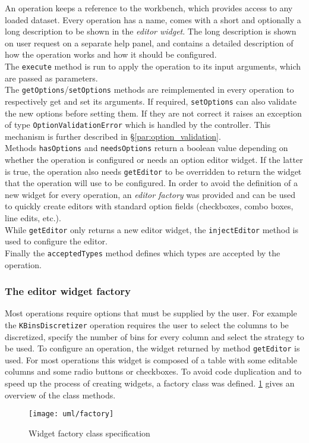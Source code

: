 An operation keeps a reference to the workbench, which provides access to any loaded dataset. Every operation has a name, comes with a short and optionally a long description to be shown in the \textit{editor widget}. The long description is shown on user request on a separate help panel, and contains a detailed description of how the operation works and how it should be configured. \\
The \texttt{execute} method is run to apply the operation to its input arguments, which are passed as parameters.\\
The \texttt{getOptions}/\texttt{setOptions} methods are reimplemented in every operation to respectively get and set its arguments. If required, \texttt{setOptions} can also validate the new options before setting them. If they are not correct it raises an exception of type \texttt{OptionValidationError} which is handled by the controller. This mechanism is further described in §\ref{par:option_validation}.\\
Methods \texttt{hasOptions} and \texttt{needsOptions} return a boolean value depending on whether the operation is configured or needs an option editor widget. If the latter is true, the operation also needs \texttt{getEditor} to be overridden to return the widget that the operation will use to be configured. In order to avoid the definition of a new widget for every operation, an \textit{editor factory} was provided and can be used to quickly create editors with standard option fields (checkboxes, combo boxes, line edits, etc.).\\
While \texttt{getEditor} only returns a new editor widget, the \texttt{injectEditor} method is used to configure the editor.\\
Finally the \texttt{acceptedTypes} method defines which types are accepted by the operation.

\subsubsection{The editor widget factory}
Most operations require options that must be supplied by the user. For example the \texttt{KBinsDiscretizer} operation requires the user to select the columns to be discretized, specify the number of bins for every column and select the strategy to be used. To configure an operation, the widget returned by method \texttt{getEditor} is used. For most operations this widget is composed of a table with some editable columns and some radio buttons or checkboxes. To avoid code duplication and to speed up the process of creating widgets, a factory class was defined. \cref{fig:factoryuml} gives an overview of the class methods.
\begin{figure}
	\centering
	\texttt{[image: uml/factory]}
	\caption{Widget factory class specification}
	\label{fig:factoryuml}
\end{figure}

